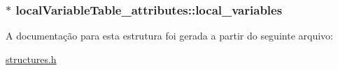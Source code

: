 \subsubsection[{\texorpdfstring{local\+\_\+variables}{local_variables}}]{$\ast$ local\+Variable\+Table\+\_\+attributes\+::local\+\_\+variables}\hypertarget{structlocalVariableTable__attributes_a78911369e8a4c58d93f579613144a8c2}{}\label{structlocalVariableTable__attributes_a78911369e8a4c58d93f579613144a8c2}


A documentação para esta estrutura foi gerada a partir do seguinte arquivo\+:\begin{DoxyCompactItemize}
\item 
\hyperlink{structures_8h}{structures.\+h}\end{DoxyCompactItemize}
